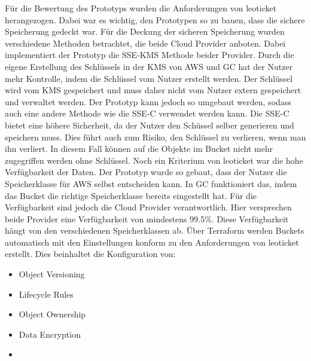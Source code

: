 Für die Bewertung des Prototyps wurden die Anforderungen von leoticket herangezogen. Dabei war es wichtig, den Prototypen so zu bauen, dass die sichere Speicherung gedeckt war. Für die Deckung der sicheren Speicherung wurden verschiedene Methoden betrachtet, die beide Cloud Provider anboten. Dabei implementiert der Prototyp die SSE-KMS Methode beider Provider. Durch die eigene Erstellung des Schlüssels in der KMS von AWS und GC hat der Nutzer mehr Kontrolle, indem die Schlüssel vom Nutzer erstellt werden. Der Schlüssel wird vom KMS gespeichert und muss daher nicht vom Nutzer extern gespeichert und verwaltet werden. Der Prototyp kann jedoch so umgebaut werden, sodass auch eine andere Methode wie die SSE-C verwendet werden kann. Die SSE-C bietet eine höhere Sicherheit, da der Nutzer den Schüssel selber generieren und speichern muss. Dies führt auch zum Risiko, den Schlüssel zu verlieren, wenn man ihn verliert. In diesem Fall können auf die Objekte im Bucket nicht mehr zugegriffen werden ohne Schlüssel. Noch ein Kriterium von leoticket war die hohe Verfügbarkeit der Daten. Der Prototyp wurde so gebaut, dass der Nutzer die Speicherklasse für AWS selbst entscheiden kann. In GC funktioniert das, indem das Bucket die richtige Speicherklasse bereits eingestellt hat. Für die Verfügbarkeit sind jedoch die Cloud Provider verantwortlich. Hier versprechen beide Provider eine Verfügbarkeit von mindestens 99.5\%. Diese Verfügbarkeit hängt von den verschiedenen Speicherklassen ab. Über Terraform werden Buckets automatisch mit den Einstellungen konform zu den Anforderungen von leoticket erstellt. Dies beinhaltet die Konfiguration von:

\begin{itemize}
	\item Object Versioning
	\item Lifecycle Rules
	\item Object Ownership
	\item Data Encryption
	\item 
\end{itemize}
